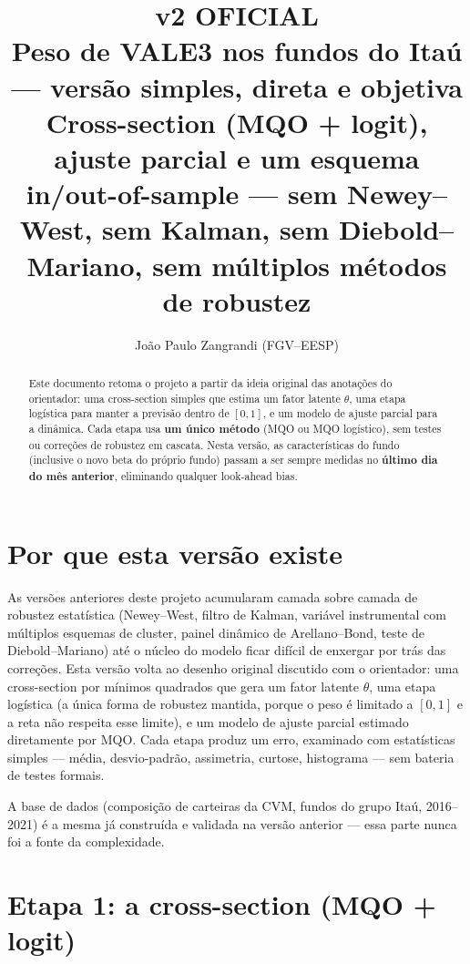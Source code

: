 \documentclass[11pt,a4paper]{article}
\title{\textbf{v2 OFICIAL}\\[8pt]
\Large Peso de VALE3 nos fundos do Itaú --- versão simples, direta e objetiva\\[4pt]
\normalsize Cross-section (MQO + logit), ajuste parcial e um esquema in/out-of-sample ---
sem Newey--West, sem Kalman, sem Diebold--Mariano, sem múltiplos métodos de robustez}
\author{João Paulo Zangrandi (FGV--EESP)}
\date{}
\begin{document}
\maketitle

\begin{abstract}
\noindent Este documento retoma o projeto a partir da ideia original das anotações do
orientador: uma cross-section simples que estima um fator latente $\theta$, uma etapa
logística para manter a previsão dentro de $[0,1]$, e um modelo de ajuste parcial para a
dinâmica. Cada etapa usa \textbf{um único método} (MQO ou MQO logístico), sem testes ou
correções de robustez em cascata. Nesta versão, as características do fundo (inclusive o novo
beta do próprio fundo) passam a ser sempre medidas no \textbf{último dia do mês anterior},
eliminando qualquer look-ahead bias.
\end{abstract}

\newpage
\tableofcontents
\newpage

\section{Por que esta versão existe}

As versões anteriores deste projeto acumularam camada sobre camada de robustez estatística
(Newey--West, filtro de Kalman, variável instrumental com múltiplos esquemas de cluster,
painel dinâmico de Arellano--Bond, teste de Diebold--Mariano) até o núcleo do modelo ficar
difícil de enxergar por trás das correções. Esta versão volta ao desenho original discutido
com o orientador: uma cross-section por mínimos quadrados que gera um fator latente $\theta$,
uma etapa logística (a única forma de robustez mantida, porque o peso é limitado a $[0,1]$ e a
reta não respeita esse limite), e um modelo de ajuste parcial estimado diretamente por MQO. Cada
etapa produz um erro, examinado com estatísticas simples --- média, desvio-padrão, assimetria,
curtose, histograma --- sem bateria de testes formais.

A base de dados (composição de carteiras da CVM, fundos do grupo Itaú, 2016--2021) é a mesma já
construída e validada na versão anterior --- essa parte nunca foi a fonte da complexidade.

\FloatBarrier
\section{Etapa 1: a cross-section (MQO + logit)}
\label{sec:etapa1}
\end{document}
